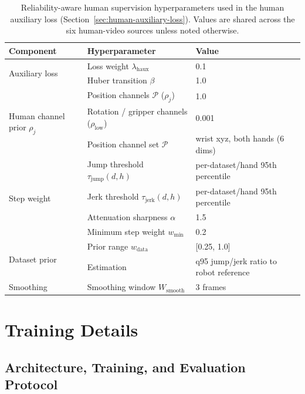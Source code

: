 \begin{table}[htbp]
\centering
\small
\caption{Reliability-aware human supervision hyperparameters used in the
human auxiliary loss (Section~\ref{sec:human-auxiliary-loss}). Values are
shared across the six human-video sources unless noted otherwise.}
\label{tab:reliability-hparams}
\renewcommand{\arraystretch}{1.1}
\begin{tabular}{lll}
\toprule
\textbf{Component} & \textbf{Hyperparameter} & \textbf{Value} \\
\midrule
\multirow{2}{*}{Auxiliary loss}
  & Loss weight $\lambda_{\mathrm{haux}}$           & 0.1 \\
  & Huber transition $\beta$                        & 1.0 \\

\midrule
\multirow{3}{*}{Human channel prior $\rho_j$}
  & Position channels $\mathcal{P}$ ($\rho_j$)        & 1.0 \\
  & Rotation / gripper channels ($\rho_{\mathrm{low}}$) & 0.001 \\  %
  & Position channel set $\mathcal{P}$                  & wrist xyz, both hands (6 dims) \\
\midrule
\multirow{4}{*}{Step weight}
  & Jump threshold $\tau_{\mathrm{jump}}(d,h)$      & per-dataset/hand 95th percentile \\
  & Jerk threshold $\tau_{\mathrm{jerk}}(d,h)$      & per-dataset/hand 95th percentile \\
  & Attenuation sharpness $\alpha$                  & 1.5 \\
  & Minimum step weight $w_{\min}$                  & 0.2 \\
\midrule
\multirow{2}{*}{Dataset prior}
  & Prior range $w_{\mathrm{data}}$                 & [0.25, 1.0] \\
  & Estimation                                      & q95 jump/jerk ratio to robot reference \\
\midrule
Smoothing
  & Smoothing window $W_{\mathrm{smooth}}$          & 3 frames \\
\bottomrule
\end{tabular}
\end{table}


\section{Training Details}
\label{app:training-details}

\subsection{Architecture, Training, and Evaluation Protocol}
\label{app:training-details-protocol}


